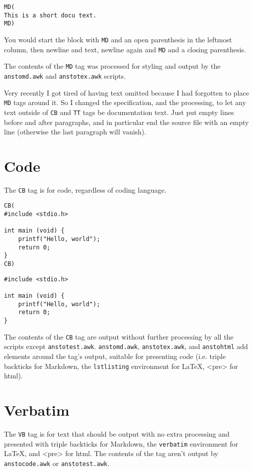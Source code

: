 \begin{verbatim}
MD(
This is a short docu text.
MD)
\end{verbatim}

You would start the block with \texttt{MD} and an open parenthesis in the leftmost column, then newline and text, newline again and \texttt{MD} and a closing parenthesis.


The contents of the \texttt{MD} tag was processed for styling and output by the \texttt{anstomd.awk} and \texttt{anstotex.awk} scripts.


Very recently I got tired of having text omitted because I had forgotten to place \texttt{MD} tags around it. So I changed the specification, and the processing, to let any text outside of \texttt{CB} and \texttt{TT} tags be documentation text. Just put empty lines before and after paragraphs, and in particular end the source file with an empty line (otherwise the last paragraph will vanish).

\section{Code}
\label{code}

The \texttt{CB} tag is for code, regardless of coding language.

\begin{verbatim}
CB(
#include <stdio.h>

int main (void) {
    printf("Hello, world");
    return 0;
}
CB)
\end{verbatim}
\begin{lstlisting}
#include <stdio.h>

int main (void) {
    printf("Hello, world");
    return 0;
}
\end{lstlisting}

The contents of the \texttt{CB} tag are output without further processing by all the scripts except \texttt{anstotest.awk}. \texttt{anstomd.awk}, \texttt{anstotex.awk}, and \texttt{anstohtml} add elements around the tag's output, suitable for presenting code (i.e. triple backticks for Markdown, the \texttt{lstlisting} environment for \LaTeX{}, <pre> for html).

\section{Verbatim}
\label{verbatim}

The \texttt{VB} tag is for text that should be output with no extra processing and presented with triple backticks for Markdown, the \texttt{verbatim} environment for \LaTeX{}, and <pre> for html. The contents of the tag aren't output by \texttt{anstocode.awk} or \texttt{anstotest.awk}.

